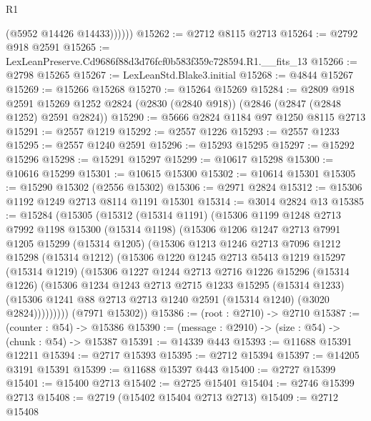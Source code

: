 \begin{lexlean}{R1}
\begin{coremodule}
              (@5952 @14426 @14433))))))
@15262 := @2712 @8115 @2713
@15264 := @2792 @918 @2591
@15265 := LexLeanPreserve.Cd9686f88d3d76fcf0b583f359c728594.R1.__fits_13
@15266 := @2798 @15265
@15267 := LexLeanStd.Blake3.initial
@15268 := @4844 @15267
@15269 := @15266 @15268
@15270 := @15264 @15269
@15284 := @2809
    @918
    @2591
    @15269
    @1252
    @2824
    (@2830 (@2840 @918))
    (@2846 (@2847 (@2848 @1252) @2591 @2824))
@15290 := @5666 @2824 @1184 @97 @1250 @8115 @2713
@15291 := @2557 @1219
@15292 := @2557 @1226
@15293 := @2557 @1233
@15295 := @2557 @1240 @2591
@15296 := @15293 @15295
@15297 := @15292 @15296
@15298 := @15291 @15297
@15299 := @10617 @15298
@15300 := @10616 @15299
@15301 := @10615 @15300
@15302 := @10614 @15301
@15305 := @15290 @15302 (@2556 @15302)
@15306 := @2971 @2824
@15312 := @15306 @1192 @1249 @2713 @8114 @1191 @15301
@15314 := @3014 @2824 @13
@15385 := @15284
    (@15305
      (@15312
        (@15314 @1191)
        (@15306
          @1199
          @1248
          @2713
          @7992
          @1198
          @15300
          (@15314 @1198)
          (@15306
            @1206
            @1247
            @2713
            @7991
            @1205
            @15299
            (@15314 @1205)
            (@15306
              @1213
              @1246
              @2713
              @7096
              @1212
              @15298
              (@15314 @1212)
              (@15306
                @1220
                @1245
                @2713
                @5413
                @1219
                @15297
                (@15314 @1219)
                (@15306
                  @1227
                  @1244
                  @2713
                  @2716
                  @1226
                  @15296
                  (@15314 @1226)
                  (@15306
                    @1234
                    @1243
                    @2713
                    @2715
                    @1233
                    @15295
                    (@15314 @1233)
                    (@15306 @1241 @88 @2713 @2713 @1240 @2591 (@15314 @1240) (@3020 @2824)))))))))
      (@7971 @15302))
@15386 := (root : @2710) -> @2710
@15387 := (counter : @54) -> @15386
@15390 := (message : @2910) -> (size : @54) -> (chunk : @54) -> @15387
@15391 := @14339 @443
@15393 := @11688 @15391 @12211
@15394 := @2717 @15393
@15395 := @2712 @15394
@15397 := @14205 @3191 @15391
@15399 := @11688 @15397 @443
@15400 := @2727 @15399
@15401 := @15400 @2713
@15402 := @2725 @15401
@15404 := @2746 @15399 @2713
@15408 := @2719 (@15402 @15404 @2713 @2713)
@15409 := @2712 @15408

\end{coremodule}
\end{lexlean}
